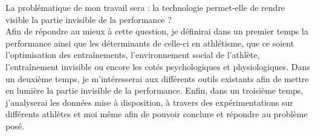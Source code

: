 La problématique de mon travail sera : la technologie permet-elle de rendre visible la partie invisible de la performance ?\\

Afin de répondre au mieux à cette question, je définirai dans un premier temps la performance ainsi que les déterminants de celle-ci en athlétisme, que ce soient l'optimisation des entraînements, l'environnement social de l'athlète, l'entraînement invisible ou encore les cotés psychologiques et physiologiques.
Dans un deuxième temps, je m’intéresserai aux différents outils existants afin de mettre en lumière la partie invisible de la performance.
Enfin, dans un troisième temps, j'analyserai les données mise à disposition, à travers des expérimentations sur différents athlètes et moi même afin de pouvoir conclure et répondre au problème posé.



